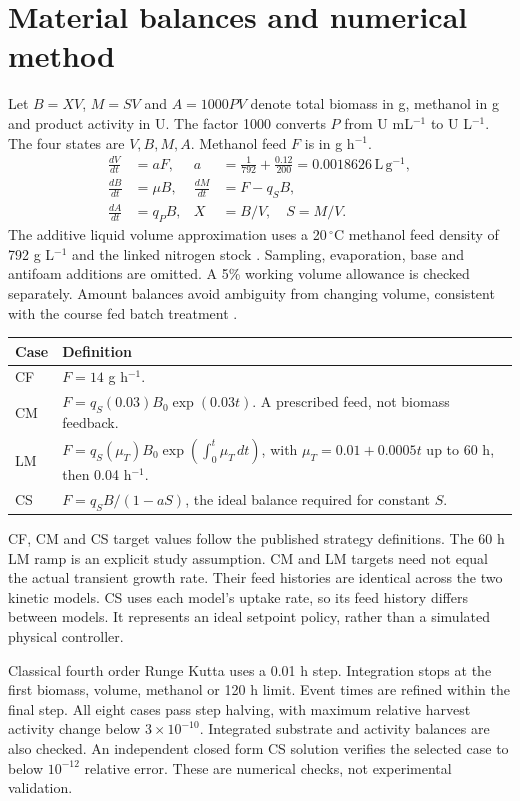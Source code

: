 \documentclass[12pt,a4paper]{article}
\newcommand{\unit}[1]{\,\mathrm{#1}}
\newcommand{\tighttable}{\setstretch{1.07}}
\begin{document}
\newpage
\section{Material balances and numerical method}
Let $B=XV$, $M=SV$ and $A=1000PV$ denote total biomass in g, methanol in g and product activity in U. The factor 1000 converts $P$ from U mL$^{-1}$ to U L$^{-1}$. The four states are $V,B,M,A$. Methanol feed $F$ is in g h$^{-1}$.
\begin{align}
\frac{dV}{dt}&=aF,& a&=\frac{1}{792}+\frac{0.12}{200}=0.0018626\unit{L\,g^{-1}},\\
\frac{dB}{dt}&=\mu B,&\frac{dM}{dt}&=F-q_SB,\\
\frac{dA}{dt}&=q_PB,& X&=B/V,\quad S=M/V.
\end{align}
The additive liquid volume approximation uses a 20\,$^{\circ}$C methanol feed density of 792 g L$^{-1}$ \cite{MethanolDensity} and the linked nitrogen stock \cite{PonteThesis}. Sampling, evaporation, base and antifoam additions are omitted. A 5\% working volume allowance is checked separately. Amount balances avoid ambiguity from changing volume, consistent with the course fed batch treatment \cite{CourseFedBatch}.

\begin{center}\tighttable
{}
\begin{tabularx}{\textwidth}{@{}L{0.08\textwidth}Y@{}}\toprule
Case & Definition\\\midrule
CF & $F=14$ g h$^{-1}$.\\
CM & $F=q_S(0.03)B_0\exp(0.03t)$. A prescribed feed, not biomass feedback.\\
LM & $F=q_S(\mu_T)B_0\exp(\int_0^t\mu_T\,dt)$, with $\mu_T=0.01+0.0005t$ up to 60 h, then 0.04 h$^{-1}$.\\
CS & $F=q_SB/(1-aS)$, the ideal balance required for constant $S$.\\\bottomrule
\end{tabularx}
\end{center}
CF, CM and CS target values follow the published strategy definitions. The 60 h LM ramp is an explicit study assumption. CM and LM targets need not equal the actual transient growth rate. Their feed histories are identical across the two kinetic models. CS uses each model's uptake rate, so its feed history differs between models. It represents an ideal setpoint policy, rather than a simulated physical controller.

Classical fourth order Runge Kutta uses a 0.01 h step. Integration stops at the first biomass, volume, methanol or 120 h limit. Event times are refined within the final step. All eight cases pass step halving, with maximum relative harvest activity change below $3\times10^{-10}$. Integrated substrate and activity balances are also checked. An independent closed form CS solution verifies the selected case to below $10^{-12}$ relative error. These are numerical checks, not experimental validation.
\end{document}
